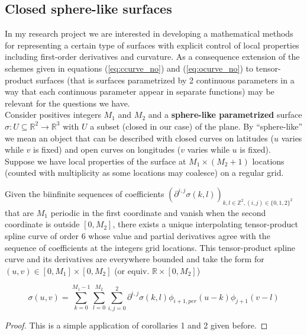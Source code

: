 \documentclass[a4paper, 11pt]{article}
\begin{document}
\subsection{Closed sphere-like surfaces}

In my research project we are interested in developing a mathematical methods for representing a certain type of 
surfaces with explicit control of local properties including first-order derivatives and curvature. As a consequence 
extension of the schemes given in equations (\ref{eq:ccurve_no}) and (\ref{eq:ocurve_no}) to tensor-product surfaces 
(that is surfaces parametrized by 2 continuous parameters in a way that each continuous parameter appear in separate 
functions) may be relevant for the questions we have. \\ 

Consider positives integers $M_1$ and $M_2$ and a \textbf{sphere-like parametrized} surface $\sigma: U \subseteq 
\mathbb{R}^2 \to \mathbb{R}^3$ with $U$ a subset (closed in our case) of the plane. By “sphere-like” we mean an object 
that can be described with closed curves on latitudes ($u$ varies while $v$ is fixed) and open curves on longitudes ($v$ 
varies while $u$ is fixed). Suppose we have local properties of the surface at $M_1\times(M_2+1)$ locations (counted 
with multiplicity as some locations may coalesce) on a regular grid. \\ 

\begin{cor}{3}
  Given the biinfinite sequences of coefficients ${(\partial^{i,j}\sigma(k,l))}_{k, l \in \mathbb{Z}^2, (i,j) \in 
  {\{0,1,2\}}^2}$ that are $M_1$ periodic in the first coordinate and vanish when the second coordinate is outside $[0, 
  M_2]$, there exists a unique interpolating tensor-product spline curve of order $6$ whose value and partial 
  derivatives agree with the sequence of coefficients at the integers grid locations. This tensor-product spline curve 
  and its derivatives are everywhere bounded and take the form for $(u,v) \in [0,M_1]\times[0, M_2]$ (or equiv.
  $\mathbb{R}\times[0, M_2]$)

  \begin{equation}
    \sigma(u,v) = \sum_{k=0}^{M_1-1} \sum_{l=0}^{M_2} \sum_{i,j = 0}^2 \partial^{i,j} \sigma(k,l) \phi_{i+1, per}(u-k) 
    \phi_{j+1}(v-l)
  \end{equation}
\end{cor}

\begin{proof}
  This is a simple application of corollaries 1 and 2 given before.
\end{proof}
\end{document}
